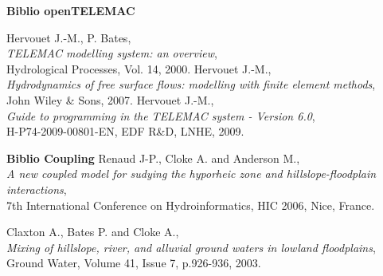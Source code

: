 
\pagebreak


\begin{thebibliography}{99}


\vspace{0.5cm}
{\bf Biblio openTELEMAC}

  {\sc Hervouet J.-M., P. Bates},\\
 {\em TELEMAC modelling system: an overview},\\
Hydrological Processes, Vol. 14, 2000.
% 
  {\sc Hervouet J.-M.},\\
 {\em Hydrodynamics of free surface flows: modelling with finite element methods},\\
John Wiley \& Sons, 2007.
% 
  {\sc Hervouet J.-M.},\\
 {\em Guide to programming in the TELEMAC system - Version 6.0},\\
H-P74-2009-00801-EN, EDF R\&D, LNHE, 2009.

\vspace{0.5cm} {\bf Biblio Coupling}
% 
  {\sc Renaud J-P., Cloke A. and Anderson M.},\\
 {\em A new coupled model for sudying the hyporheic zone and hillslope-floodplain interactions},\\
7th International Conference on Hydroinformatics, HIC 2006, Nice, France.

  {\sc Claxton A., Bates P. and Cloke A.},\\
 {\em Mixing of hillslope, river, and alluvial ground waters in lowland floodplains},\\
Ground Water, Volume 41, Issue 7, p.926-936, 2003.

% 
\end{thebibliography}
